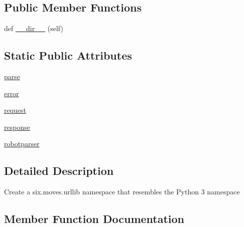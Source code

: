 \subsection*{Public Member Functions}
\begin{DoxyCompactItemize}
\item 
def \hyperlink{classpip_1_1__vendor_1_1urllib3_1_1packages_1_1six_1_1Module__six__moves__urllib_a3f2a1837d92995bb2d6d0af791b36d99}{\+\_\+\+\_\+dir\+\_\+\+\_\+} (self)
\end{DoxyCompactItemize}
\subsection*{Static Public Attributes}
\begin{DoxyCompactItemize}
\item 
\hyperlink{classpip_1_1__vendor_1_1urllib3_1_1packages_1_1six_1_1Module__six__moves__urllib_a61c06fcc85fbe8b3598601fb11ff571a}{parse}
\item 
\hyperlink{classpip_1_1__vendor_1_1urllib3_1_1packages_1_1six_1_1Module__six__moves__urllib_ab44df14175066597ec057e517a7b0f8a}{error}
\item 
\hyperlink{classpip_1_1__vendor_1_1urllib3_1_1packages_1_1six_1_1Module__six__moves__urllib_aa99efb13cb3f92e393d7b7b3c3f00652}{request}
\item 
\hyperlink{classpip_1_1__vendor_1_1urllib3_1_1packages_1_1six_1_1Module__six__moves__urllib_ad2646f3ca9cb3c7b891d36f5f1883f5d}{response}
\item 
\hyperlink{classpip_1_1__vendor_1_1urllib3_1_1packages_1_1six_1_1Module__six__moves__urllib_a2364f6f1eb4068d49cbfc96954f8af6d}{robotparser}
\end{DoxyCompactItemize}


\subsection{Detailed Description}
\begin{DoxyVerb}Create a six.moves.urllib namespace that resembles the Python 3 namespace\end{DoxyVerb}
 

\subsection{Member Function Documentation}
\mbox{\label{classpip_1_1__vendor_1_1urllib3_1_1packages_1_1six_1_1Module__six__moves__urllib_a3f2a1837d92995bb2d6d0af791b36d99}} 
